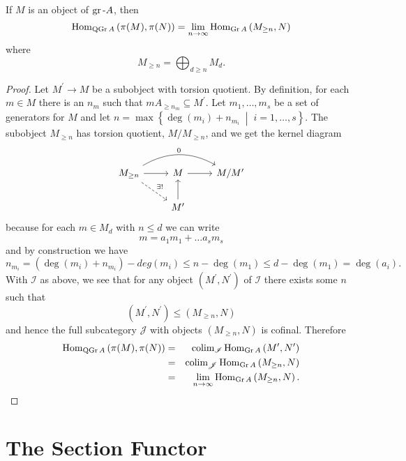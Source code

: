 \documentclass[dissertation.tex]{subfiles}
\begin{document}
\begin{prop}
  If $M$ is an object of $\operatorname{gr}\text{-}A$, then 
  $$\operatorname{Hom}_{\operatorname{QGr}A}\left(\pi(M), \pi(N)\right) = \lim_{n \rightarrow \infty} \operatorname{Hom}_{\operatorname{Gr}A}\left(M_{\geq n}, N\right)$$
  where 
  $$M_{\geq n} = \bigoplus_{d \geq n} M_d.$$
  \begin{proof}
    Let $M^\prime \rightarrow M$ be a subobject with torsion quotient.
    By definition, for each $m \in M$ there is an $n_m$ such that $mA_{\geq n_m} \subseteq M^\prime$.
    Let $m_1, \ldots, m_s$ be a set of generators for $M$ and let $n = \max\left\{\deg(m_i) + n_{m_i} \;\middle\vert\; i = 1, \ldots , s\right\}$.
    The subobject $M_{\geq n}$ has torsion quotient, $M/M_{\geq n}$, and we get the kernel diagram
    $$\begin{tikzcd}
      M_{\geq n} \arrow[bend left]{rr}{0} \arrow[dashed]{rd}{\exists !}\arrow{r} & M \arrow{r} & M/M^\prime\\
      & M^\prime \arrow{u}
    \end{tikzcd}$$
    because for each $m \in M_{d}$ with $n \leq d$ we can write
    $$m = a_1m_1 + \ldots a_sm_s$$
    and by construction we have
    $$n_{m_i} = (\deg(m_i) + n_{m_i}) - deg(m_i) \leq n - \deg(m_1) \leq d - \deg(m_1) = \deg(a_i).$$
    With $\mathscr{I}$ as above, we see that for any object $(M^\prime, N^\prime)$ of $\mathscr{I}$ there exists some $n$ such that
    $$(M^\prime, N^\prime) \leq (M_{\geq n}, N)$$
    and hence the full subcategory $\mathscr{J}$ with objects $(M_{\geq n}, N)$ is cofinal.
    Therefore
    \begin{eqnarray*}
      \operatorname{Hom}_{\operatorname{QGr}A}\left(\pi(M), \pi(N)\right) &=& \operatorname{colim}_{\mathscr{I}}\operatorname{Hom}_{\operatorname{Gr}A}\left(M^\prime, N^\prime\right)\\
      &=& \operatorname{colim}_{\mathscr{J}}\operatorname{Hom}_{\operatorname{Gr}A}\left(M_{\geq n}, N\right)\\
      &=& \lim_{n \rightarrow \infty} \operatorname{Hom}_{\operatorname{Gr}A}\left(M_{\geq n}, N\right).
    \end{eqnarray*}
  \end{proof}
\end{prop}

\section{The Section Functor}
\end{document}

